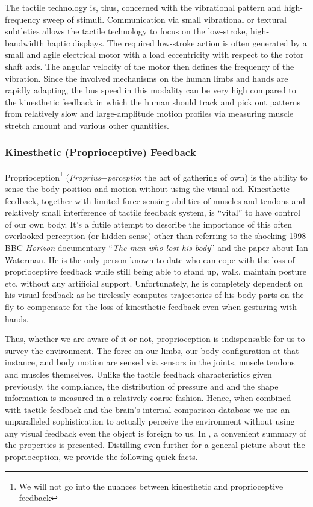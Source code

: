 The tactile technology is, thus, concerned with the vibrational pattern and high-frequency sweep of stimuli. Communication via small vibrational or textural subtleties allows the tactile technology to focus on the low-stroke, high-bandwidth haptic displays. The required low-stroke action is often generated by a small and agile electrical motor with a load eccentricity with respect to the rotor shaft axis. The angular velocity of the motor then defines the frequency of the vibration. Since the involved mechanisms on the human limbs and hands are rapidly adapting, the bus speed in this modality can be very high compared to the kinesthetic feedback in which the human should track and pick out patterns from relatively slow and large-amplitude motion profiles via measuring muscle stretch amount and various other quantities. 


\subsubsection{Kinesthetic (Proprioceptive) Feedback}
Proprioception\footnote{We will not go into the nuances between kinesthetic and proprioceptive feedback} (\emph{Proprius}+\emph{perceptio}: the act of gathering of own) is the ability to sense the body position and motion without using the visual aid. Kinesthetic feedback, together with limited force sensing abilities of muscles and tendons and relatively small interference of tactile feedback system, is \enquote{vital} to have control of our own body. It's a futile attempt to describe the importance of this often overlooked perception (or hidden sense) other than referring to the shocking 1998 BBC \emph{Horizon} documentary \enquote{\emph{The man who lost his body}} and the paper \cite{waterman} about Ian Waterman. He is the only person known to date who can cope with the loss of proprioceptive feedback while still being able to stand up, walk, maintain posture etc. without any artificial support. Unfortunately, he is completely dependent on his visual feedback as he tirelessly computes trajectories of his body parts on-the-fly to compensate for the loss of kinesthetic feedback even when gesturing with hands. 

Thus, whether we are aware of it or not, proprioception is indispensable for us to survey the environment. The force on our limbs, our body configuration at that instance, and body motion are sensed via sensors in the joints, muscle tendons and muscles themselves. Unlike the tactile feedback characteristics given previously, the compliance, the distribution of pressure and and the shape information is measured in a relatively coarse fashion. Hence, when combined with tactile feedback and the brain's internal comparison database we use an unparalleled sophistication to actually perceive the environment without using any visual feedback even the object is foreign to us. In \cite{biggssrinivasan}, a convenient summary of the properties is presented. Distilling even further for a general picture about the proprioception, we provide the following quick facts. 

